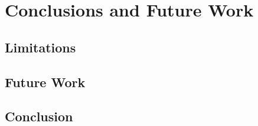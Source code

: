\chapter{Conclusions and Future Work}


\section{Limitations}


\section{Future Work}


\section{Conclusion}